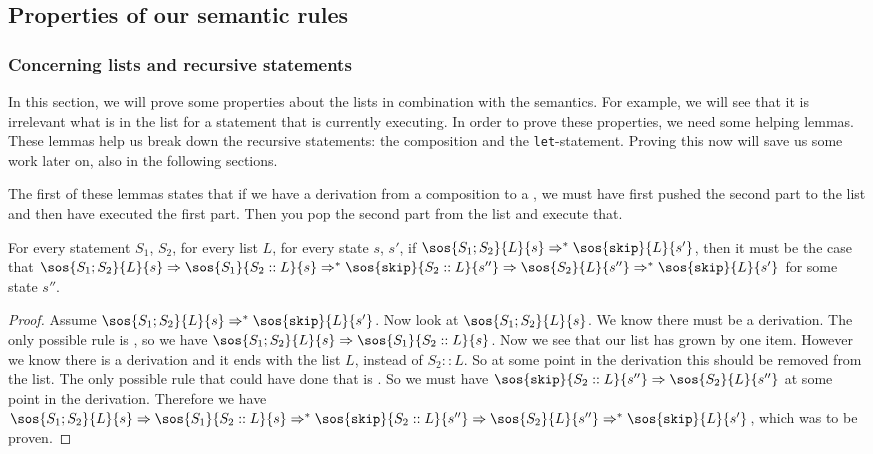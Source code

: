 \subsection{Properties of our semantic rules}

\subsubsection*{Concerning lists and recursive statements}
In this section, we will prove some properties about the lists in combination with the semantics. For example, we will see that it is irrelevant what is in the list for a statement that is currently executing. 
In order to prove these properties, we need some helping lemmas. These lemmas help us break down the recursive statements: the composition and the \texttt{let}-statement. Proving this now will save us some work later on, also in the following sections.  

The first of these lemmas states that if we have a derivation from a composition to a \sk, we must have first pushed the second part to the list and then have executed the first part. Then you pop the second part from the list and execute that. 

\begin{lemma}
\label{breakingdowncomp}
For every statement $S_1$, $S_2$, for every list $L$, for every state $s$, $s'$, if $\sos{S_1; S_2}{L}{s} \Rightarrow ^{*} \sos{\texttt{skip}}{L}{s'}$, then it must be the case that $\sos{S_1;S_2}{L}{s}  \Rightarrow \sos{S_1}{S_2::L}{s} \Rightarrow ^{*} \sos{\texttt{skip}}{S_2::L}{s''} \Rightarrow \sos{S_2}{L}{s''} \Rightarrow ^{*} \sos{\texttt{skip}}{L}{s'}$ for some state $s''$. 
\end{lemma}

\begin{proof}
Assume $\sos{S_1; S_2}{L}{s } \Rightarrow ^{*} \sos{\texttt{skip}}{L}{s'}$. Now look at $\sos{S_1; S_2}{L}{s}$. We know there must be a derivation. The only possible rule is \compsos, so we have $\sos{S_1; S_2}{L}{s} \Rightarrow \sos{S_1}{S_2::L}{s}$. Now we see that our list has grown by one item. However we know there is a derivation and it ends with the list $L$, instead of $S_2::L$. So at some point in the derivation this should be removed from the list. The only possible rule that could have done that is \loadsos. So we must have $\sos{\texttt{skip}}{S_2::L}{s''} \Rightarrow \sos{S_2}{L}{s''}$ at some point in the derivation. Therefore we have $\sos{S_1; S_2}{L}{s} \Rightarrow \sos{S_1}{S_2::L}{s} \Rightarrow ^{*} \sos{\texttt{skip}}{S_2::L}{s''} \Rightarrow \sos{S_2}{L}{s''} \Rightarrow ^{*} \sos{\texttt{skip}}{L}{s'}$, which was to be proven.
\end{proof}

